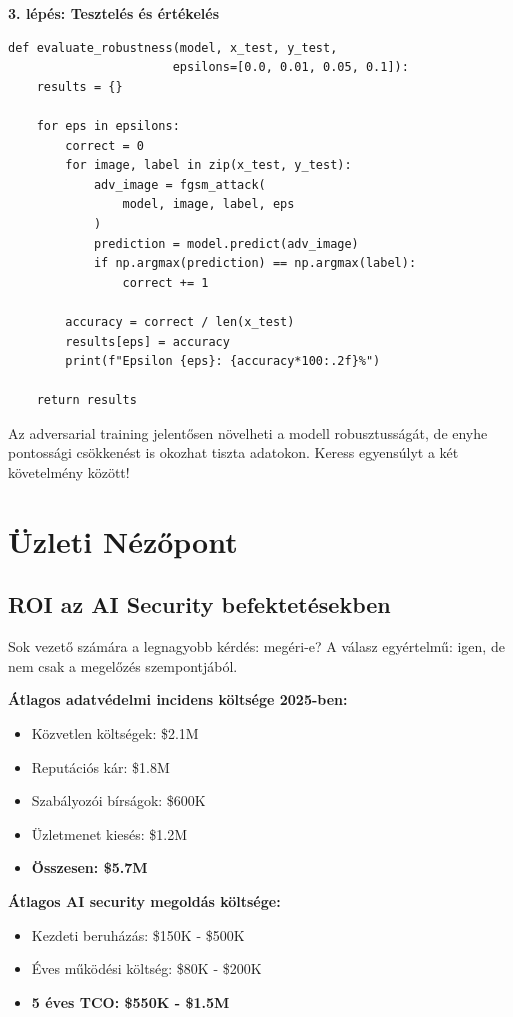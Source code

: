 \documentclass{../templates/magazine}
\begin{document}
\textbf{3. lépés: Tesztelés és értékelés}

\begin{verbatim}
def evaluate_robustness(model, x_test, y_test,
                       epsilons=[0.0, 0.01, 0.05, 0.1]):
    results = {}

    for eps in epsilons:
        correct = 0
        for image, label in zip(x_test, y_test):
            adv_image = fgsm_attack(
                model, image, label, eps
            )
            prediction = model.predict(adv_image)
            if np.argmax(prediction) == np.argmax(label):
                correct += 1

        accuracy = correct / len(x_test)
        results[eps] = accuracy
        print(f"Epsilon {eps}: {accuracy*100:.2f}%")

    return results
\end{verbatim}

\begin{tipbox}
Az adversarial training jelentősen növelheti a modell robusztusságát, de enyhe pontossági csökkenést is okozhat tiszta adatokon. Keress egyensúlyt a két követelmény között!
\end{tipbox}

\newpage

\section{Üzleti Nézőpont}

\subsection{ROI az AI Security befektetésekben}

Sok vezető számára a legnagyobb kérdés: megéri-e? A válasz egyértelmű: igen, de nem csak a megelőzés szempontjából.

\begin{infobox}
\textbf{Átlagos adatvédelmi incidens költsége 2025-ben:}
\begin{itemize}
    \item Közvetlen költségek: \$2.1M
    \item Reputációs kár: \$1.8M
    \item Szabályozói bírságok: \$600K
    \item Üzletmenet kiesés: \$1.2M
    \item \textbf{Összesen: \$5.7M}
\end{itemize}

\textbf{Átlagos AI security megoldás költsége:}
\begin{itemize}
    \item Kezdeti beruházás: \$150K - \$500K
    \item Éves működési költség: \$80K - \$200K
    \item \textbf{5 éves TCO: \$550K - \$1.5M}
\end{itemize}
\end{infobox}
\end{document}
